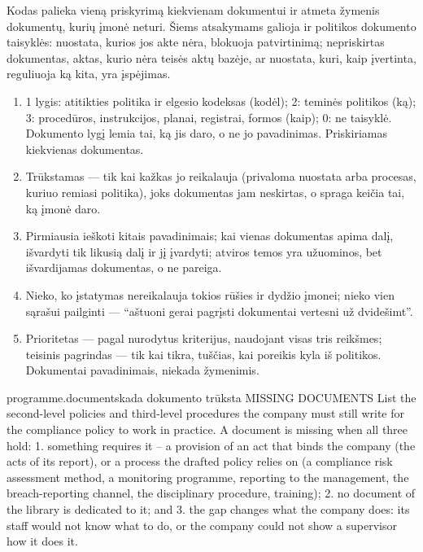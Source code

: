 Kodas palieka vieną priskyrimą kiekvienam dokumentui ir atmeta žymenis dokumentų, kurių įmonė
neturi. Šiems atsakymams galioja ir politikos dokumento taisyklės: nuostata, kurios jos akte
nėra, blokuoja patvirtinimą; nepriskirtas dokumentas, aktas, kurio nėra teisės aktų bazėje, ar
nuostata, kuri, kaip įvertinta, reguliuoja ką kita, yra įspėjimas.

\begin{enumerate}[itemsep=1pt, topsep=3pt]
  \item 1 lygis: atitikties politika ir elgesio kodeksas (kodėl); 2: teminės politikos (ką);
    3: procedūros, instrukcijos, planai, registrai, formos (kaip); 0: ne taisyklė. Dokumento
    lygį lemia tai, ką jis daro, o ne jo pavadinimas. Priskiriamas kiekvienas dokumentas.
  \item Trūkstamas --- tik kai kažkas jo reikalauja (privaloma nuostata arba procesas, kuriuo
    remiasi politika), joks dokumentas jam neskirtas, o spraga keičia tai, ką įmonė daro.
  \item Pirmiausia ieškoti kitais pavadinimais; kai vienas dokumentas apima dalį, išvardyti tik
    likusią dalį ir jį įvardyti; atviros temos yra užuominos, bet išvardijamas dokumentas, o ne
    pareiga.
  \item Nieko, ko įstatymas nereikalauja tokios rūšies ir dydžio įmonei; nieko vien sąrašui pailginti ---
    \enquote{aštuoni gerai pagrįsti dokumentai vertesni už dvidešimt}.
  \item Prioritetas --- pagal nurodytus kriterijus, naudojant visas tris reikšmes; teisinis
    pagrindas --- tik kai tikra, tuščias, kai poreikis kyla iš politikos. Dokumentai
    pavadinimais, niekada žymenimis.
\end{enumerate}

\par\nopagebreak
\begin{promptexcerpt}{programme.documents}{kada dokumento trūksta}
MISSING DOCUMENTS
List the second-level policies and third-level procedures the company must still write for the compliance policy to work in practice. A document is missing when all three hold:
1. something requires it – a provision of an act that binds the company (the acts of its report), or a process the drafted policy relies on (a compliance risk assessment method, a monitoring programme, reporting to the management, the breach-reporting channel, the disciplinary procedure, training);
2. no document of the library is dedicated to it; and
3. the gap changes what the company does: its staff would not know what to do, or the company could not show a supervisor how it does it.
\end{promptexcerpt}

